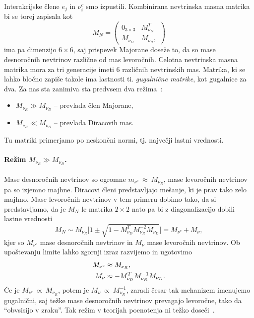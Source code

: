 Interakcijske člene $e_j$ in $\nu^c_i$ smo izpustili. Kombinirana nevtrinska masna matrika bi se torej
zapisala kot~\cite{strumia}
\begin{equation}
	M_N = \begin{pmatrix}
		0_{3\times 3} & M^T_{\nu_D} \\ M_{\nu_D} & M_{\nu_R},
	\end{pmatrix}
\end{equation}
ima pa dimenzijo $6\times 6$, saj prispevek Majorane doseže to, da so mase desnoročnih nevtrinov
različne od mas levoročnih. Celotna nevtrinska masna matrika mora za tri generacije imeti 6 različnih
nevtrinskih mas. Matrika, ki se lahko bločno zapiše takole ima lastnosti ti. \emph{gugalnične matrike},
kot gugalnice za dva. Za nas sta zanimiva sta predvsem dva režima~\cite{strumia}:
\begin{itemize}
	\item{$M_{\nu_R} \gg M_{\nu_D}$ -- prevlada člen Majorane,}
	\item{$M_{\nu_R} \ll M_{\nu_D}$ -- prevlada Diracovih mas.}
\end{itemize}
Tu matriki primerjamo po neskončni normi, tj. največji lastni vrednosti.

\paragraph{Režim $M_{\nu_R} \gg M_{\nu_D}$.}

Mase desnoročnih nevtrinov so ogromne $m_{\nu^c}\ \approx\ M_{\nu_R}$, mase levoročnih nevtrinov pa so
izjemno majhne. Diracovi členi predstavljajo mešanje, ki je prav tako zelo majhno. Mase levoročnih
nevtrinov v tem primeru dobimo tako, da si predstavljamo, da je $M_N$ le matrika $2\times 2$ nato pa bi
z diagonalizacijo dobili lastne vrednosti~\cite{miha}
\begin{equation}
	M_N \sim M_{\nu_R}\bigg[1 \pm \sqrt{1 - M_{\nu_D}^TM_{\nu_R}^{-2}M_{\nu_D}}\bigg] = M_{\nu^c} +
		M_\nu,
\end{equation}
kjer so $M_{\nu^c}$ mase desnoročnih nevtrinov in $M_\nu$ mase levoročnih nevtrinov. Ob upoštevanju
limite lahko zgornji izraz razvijemo in ugotovimo~\cite{strumia}
\begin{align}
	M_{\nu^c} &\approx M_{\nu_R}, \notag \\
	M_\nu &\approx -M_{\nu_D}^T M_{\nu_R}^{-1}M_{\nu_D}.
\end{align}
Če je $M_{\nu^c}\ \propto\ M_{\nu_R}$, potem je $M_\nu\ \propto\ M_{\nu_R}^{-1}$, zaradi česar tak
mehanizem imenujemo gugalnični, saj težke mase desnoročnih nevtrinov prevagajo levoročne, tako da
"`obvsisijo v zraku"'. Tak režim v teorijah poenotenja ni težko doseči~\cite{strumia}.

